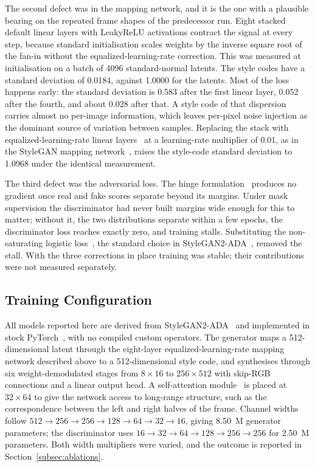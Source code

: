\documentclass[electronics,article,submit,pdftex,moreauthors]{Definitions/mdpi}
\begin{document}
The second defect was in the mapping network, and it is the one with a
plausible bearing on the repeated frame shapes of the predecessor run. Eight
stacked default linear layers with LeakyReLU activations contract the signal
at every step, because standard initialisation scales weights by the inverse
square root of the fan-in without the equalized-learning-rate correction.
This was measured at initialisation on a batch of 4096 standard-normal
latents. The style codes have a standard deviation of 0.0184, against 1.0000
for the latents. Most of the loss happens early: the standard deviation is
0.583 after the first linear layer, 0.052 after the fourth, and about 0.028
after that. A style code of that
dispersion carries almost no per-image information, which leaves per-pixel
noise injection as the dominant source of variation between samples. Replacing
the stack with equalized-learning-rate linear layers~\cite{karras2018progressive}
at a learning-rate multiplier of 0.01, as in the StyleGAN mapping
network~\cite{karras2019stylegan}, raises the
style-code standard deviation to 1.0968 under the identical measurement.

The third defect was the adversarial loss. The hinge
formulation~\cite{lim2017geometric} produces no gradient once real and fake
scores separate beyond its margins. Under mask supervision the discriminator
had never built margins wide enough for this to matter; without it, the two
distributions separate within a few epochs, the discriminator loss reaches
exactly zero, and training stalls. Substituting the non-saturating logistic loss~\cite{goodfellow2014gan},
the standard choice in StyleGAN2-ADA~\cite{karras2020stylegan2,karras2020ada},
removed the stall.
With the three corrections in place training was stable; their contributions were not measured separately.

\subsection{Training Configuration}
\label{subsec:training}

All models reported here are derived from
StyleGAN2-ADA~\cite{karras2020stylegan2,karras2020ada} and implemented in stock
PyTorch~\cite{paszke2019pytorch}, with no compiled custom operators. The
generator maps a 512-dimensional latent through the eight-layer
equalized-learning-rate mapping network described above to a 512-dimensional
style code, and synthesises through six weight-demodulated stages from $8
\times 16$ to $256 \times 512$ with skip-RGB connections and a linear output
head. A self-attention module~\cite{zhang2019self} is placed at $32 \times 64$
to give the network access to long-range structure, such as the
correspondence between the left and right halves of the frame. Channel widths follow $512 \rightarrow
256 \rightarrow 256 \rightarrow 128 \rightarrow 64 \rightarrow 32 \rightarrow
16$, giving 8.50~M generator parameters; the discriminator uses $16
\rightarrow 32 \rightarrow 64 \rightarrow 128 \rightarrow 256 \rightarrow 256$
for 2.50~M parameters. Both width multipliers were varied, and the outcome is
reported in Section~\ref{subsec:ablations}.
\end{document}
